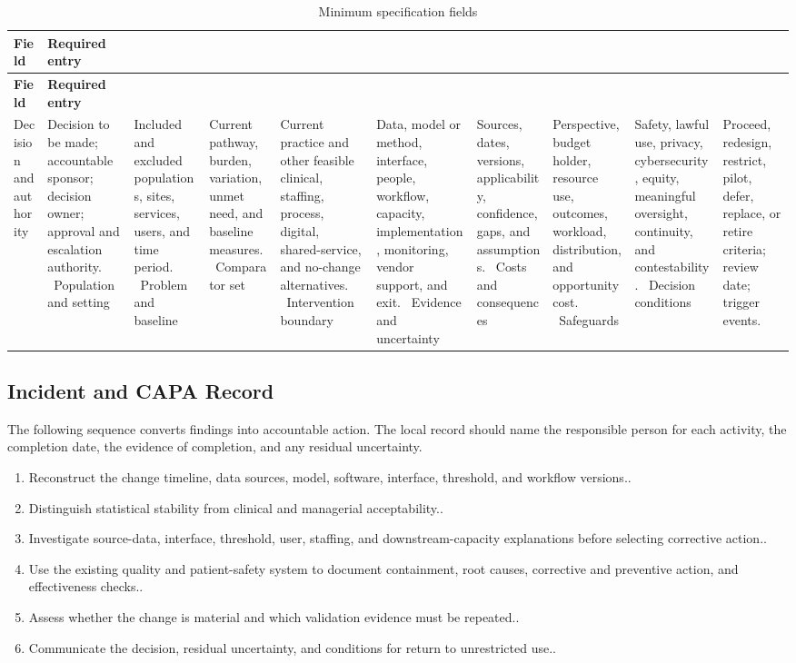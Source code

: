 \begin{longtable}{@{}p{}p{}@{}}
\caption{Minimum specification fields}
\label{tab:comp-ch05-spec-fields}\\
\toprule
\textbf{Field} & \textbf{Required entry} \\
\midrule
\endfirsthead
\toprule
\textbf{Field} & \textbf{Required entry} \\
\midrule
\endhead
\bottomrule
\endlastfoot
Decision and authority & Decision to be made; accountable sponsor; decision owner; approval and escalation authority. \
Population and setting & Included and excluded populations, sites, services, users, and time period. \
Problem and baseline & Current pathway, burden, variation, unmet need, and baseline measures. \
Comparator set & Current practice and other feasible clinical, staffing, process, digital, shared-service, and no-change alternatives. \
Intervention boundary & Data, model or method, interface, people, workflow, capacity, implementation, monitoring, vendor support, and exit. \
Evidence and uncertainty & Sources, dates, versions, applicability, confidence, gaps, and assumptions. \
Costs and consequences & Perspective, budget holder, resource use, outcomes, workload, distribution, and opportunity cost. \
Safeguards & Safety, lawful use, privacy, cybersecurity, equity, meaningful oversight, continuity, and contestability. \
Decision conditions & Proceed, redesign, restrict, pilot, defer, replace, or retire criteria; review date; trigger events. \
\end{longtable}

\subsection{Incident and CAPA Record}
\label{sec:comp-ch05-supp-2}
The following sequence converts findings into accountable action. The local record
should name the responsible person for each activity, the completion date, the
evidence of completion, and any residual uncertainty.

\begin{enumerate}
 \item Reconstruct the change timeline, data sources, model, software, interface, threshold, and workflow versions..
 \item Distinguish statistical stability from clinical and managerial acceptability..
 \item Investigate source-data, interface, threshold, user, staffing, and downstream-capacity explanations before selecting corrective action..
 \item Use the existing quality and patient-safety system to document containment, root causes, corrective and preventive action, and effectiveness checks..
 \item Assess whether the change is material and which validation evidence must be repeated..
 \item Communicate the decision, residual uncertainty, and conditions for return to unrestricted use..
\end{enumerate}

